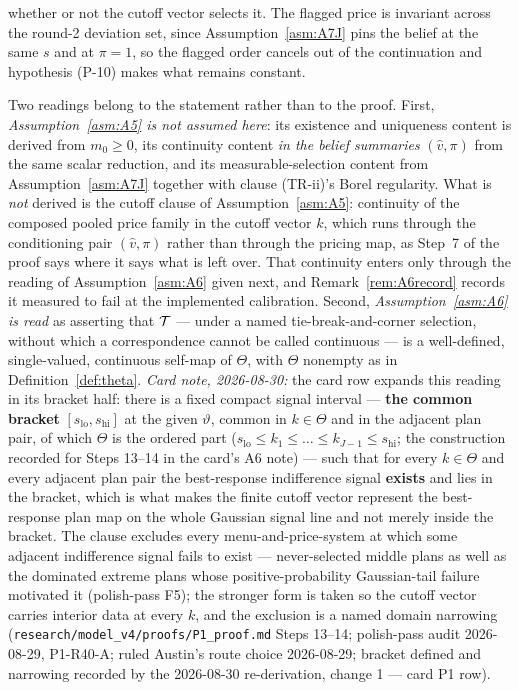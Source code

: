 \begin{proposition}
\begin{enumerate}[label=(\roman*),leftmargin=2.4em,itemsep=3pt]
  whether or not the cutoff vector selects it. The flagged price is invariant across the round-2
  deviation set, since Assumption~\ref{asm:A7J} pins the belief at the same $s$ and at $\pi = 1$, so
  the flagged order cancels out of the continuation and hypothesis (P-10) makes what remains
  constant.
\end{enumerate}
Two readings belong to the statement rather than to the proof. First, \emph{Assumption~\ref{asm:A5}
is not assumed here}: its existence and uniqueness content is derived from $m_0 \ge 0$, its
continuity content \emph{in the belief summaries} $(\hat v,\pi)$ from the same scalar reduction, and
its measurable-selection content from Assumption~\ref{asm:A7J} together with clause (TR-ii)'s Borel
regularity. What is \emph{not} derived is the cutoff clause of Assumption~\ref{asm:A5}: continuity
of the composed pooled price family in the cutoff vector $k$, which runs through the conditioning
pair $(\hat v,\pi)$ rather than through the pricing map, as Step~7 of the proof says where it says
what is left over. That continuity enters only through the reading of Assumption~\ref{asm:A6} given
next, and Remark~\ref{rem:A6record} records it measured to fail at the implemented calibration.
Second,
\emph{Assumption~\ref{asm:A6} is read} as asserting that $\mathcal{T}$ --- under a named
tie-break-and-corner selection, without which a correspondence cannot be called continuous --- is a
well-defined, single-valued, continuous self-map of $\Theta$, with $\Theta$ nonempty as in
Definition~\ref{def:theta}. \emph{Card note, 2026-08-30:} the card row expands this reading in
its bracket half: there is a fixed compact signal interval --- \textbf{the common bracket}
$[s_{\mathrm{lo}},s_{\mathrm{hi}}]$ at the given $\vartheta$, common in $k \in \Theta$ and in the
adjacent plan pair, of which $\Theta$ is the ordered part
($s_{\mathrm{lo}} \le k_1 \le \dots \le k_{J-1} \le s_{\mathrm{hi}}$; the construction recorded
for Steps 13--14 in the card's A6 note) --- such that for every $k \in \Theta$ and every adjacent
plan pair the best-response indifference signal \textbf{exists} and lies in the bracket, which is
what makes the finite cutoff vector represent the best-response plan map on the whole Gaussian
signal line and not merely inside the bracket. The clause excludes every menu-and-price-system at
which some adjacent indifference signal fails to exist --- never-selected middle plans as well as
the dominated extreme plans whose positive-probability Gaussian-tail failure motivated it
(polish-pass F5); the stronger form is taken so the cutoff vector carries interior data at every
$k$, and the exclusion is a named domain narrowing
(\texttt{research/model\_v4/proofs/P1\_proof.md} Steps 13--14; polish-pass audit 2026-08-29,
P1-R40-A; ruled Austin's route choice 2026-08-29; bracket defined and narrowing recorded by the
2026-08-30 re-derivation, change 1 --- card P1 row).


\end{proposition}
